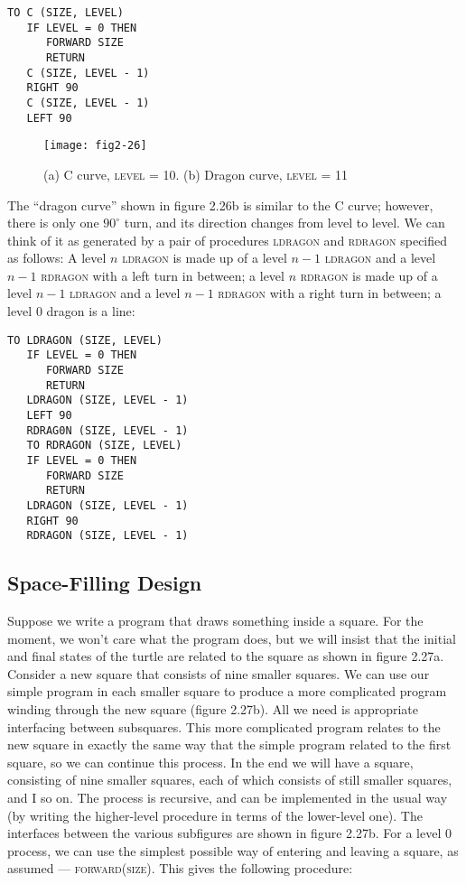 \documentclass{book}
\begin{document}
\begin{verbatim}
TO C (SIZE, LEVEL)
   IF LEVEL = 0 THEN
      FORWARD SIZE
      RETURN
   C (SIZE, LEVEL - 1)
   RIGHT 90
   C (SIZE, LEVEL - 1)
   LEFT 90
\end{verbatim}
\begin{figure}
\begin{center}
\texttt{[image: fig2-26]}
\caption{(a) C curve, \textsc{level} = 10. (b) Dragon curve, \textsc{level} = 11}
\end{center}
\end{figure}

The ``dragon curve'' shown in figure 2.26b is similar to the C curve;
however, there is only one $90^{\circ}$ turn, and its direction changes from level
to level. We can think of it as generated by a pair of procedures \textsc{ldragon}
and \textsc{rdragon} specified as follows: A level $n$ \textsc{ldragon} is made up of a level
$n - 1$ \textsc{ldragon} and a level $n - 1$ \textsc{rdragon} with a left turn in between; a
level $n$ \textsc{rdragon} is made up of a level $n - 1$ \textsc{ldragon} and a level $n - 1$
\textsc{rdragon} with a right turn in between; a level 0 dragon is a line:

\begin{verbatim}
TO LDRAGON (SIZE, LEVEL)
   IF LEVEL = 0 THEN
      FORWARD SIZE
      RETURN
   LDRAGON (SIZE, LEVEL - 1)
   LEFT 90
   RDRAG0N (SIZE, LEVEL - 1)
   TO RDRAGON (SIZE, LEVEL)
   IF LEVEL = 0 THEN
      FORWARD SIZE
      RETURN
   LDRAGON (SIZE, LEVEL - 1)
   RIGHT 90
   RDRAGON (SIZE, LEVEL - 1) 
\end{verbatim}
\subsection{Space-Filling Design}

Suppose we write a program that draws something inside a square. For
the moment, we won't care what the program does, but we will insist
that the initial and final states of the turtle are related to the square
as shown in figure 2.27a. Consider a new square that consists of nine
smaller squares. We can use our simple program in each smaller square
to produce a more complicated program winding through the new square
(figure 2.27b). All we need is appropriate interfacing between subsquares.
This more complicated program relates to the new square in exactly
the same way that the simple program related to the first square, so we
can continue this process. In the end we will have a square, consisting of
nine smaller squares, each of which consists of still smaller squares, and
I so on. The process is recursive, and can be implemented in the usual
way (by writing the higher-level procedure in terms of the lower-level
one). The interfaces between the various subfigures are shown in figure
2.27b. For a level 0 process, we can use the simplest possible way of
entering and leaving a square, as assumed --- \textsc{forward(size)}. This gives
the following procedure:
\end{document}
